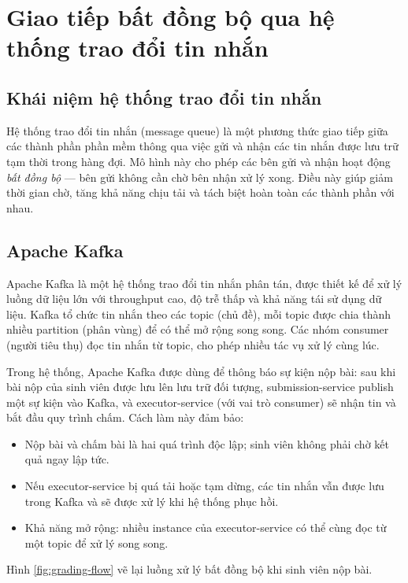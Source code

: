 \documentclass[../BTL.tex]{subfiles}
\begin{document}
\section{Giao tiếp bất đồng bộ qua hệ thống trao đổi tin nhắn}
\label{section:2.5}

\subsection{Khái niệm hệ thống trao đổi tin nhắn}
\label{section:2.5.1}

Hệ thống trao đổi tin nhắn (message queue) là một phương thức giao tiếp giữa các thành phần phần mềm thông qua việc gửi và nhận các tin nhắn được lưu trữ tạm thời trong hàng đợi. Mô hình này cho phép các bên gửi và nhận hoạt động \textit{bất đồng bộ} --- bên gửi không cần chờ bên nhận xử lý xong. Điều này giúp giảm thời gian chờ, tăng khả năng chịu tải và tách biệt hoàn toàn các thành phần với nhau.

\subsection{Apache Kafka}
\label{section:2.5.2}

Apache Kafka là một hệ thống trao đổi tin nhắn phân tán, được thiết kế để xử lý luồng dữ liệu lớn với throughput cao, độ trễ thấp và khả năng tái sử dụng dữ liệu. Kafka tổ chức tin nhắn theo các topic (chủ đề), mỗi topic được chia thành nhiều partition (phân vùng) để có thể mở rộng song song. Các nhóm consumer (người tiêu thụ) đọc tin nhắn từ topic, cho phép nhiều tác vụ xử lý cùng lúc.

Trong hệ thống, Apache Kafka được dùng để thông báo sự kiện nộp bài: sau khi bài nộp của sinh viên được lưu lên lưu trữ đối tượng, submission-service publish một sự kiện vào Kafka, và executor-service (với vai trò consumer) sẽ nhận tin và bắt đầu quy trình chấm. Cách làm này đảm bảo:
\begin{itemize}
    \item Nộp bài và chấm bài là hai quá trình độc lập; sinh viên không phải chờ kết quả ngay lập tức.
    \item Nếu executor-service bị quá tải hoặc tạm dừng, các tin nhắn vẫn được lưu trong Kafka và sẽ được xử lý khi hệ thống phục hồi.
    \item Khả năng mở rộng: nhiều instance của executor-service có thể cùng đọc từ một topic để xử lý song song.
\end{itemize}

Hình \ref{fig:grading-flow} vẽ lại luồng xử lý bất đồng bộ khi sinh viên nộp bài.
\end{document}
